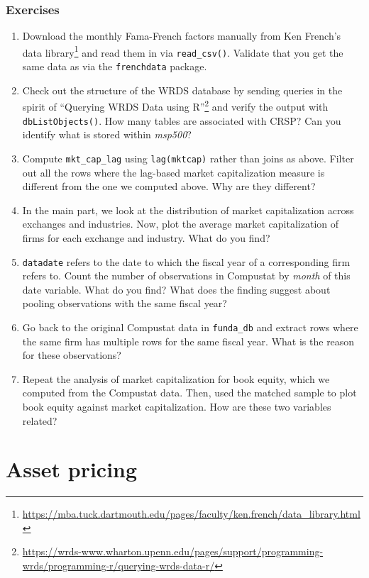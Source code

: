 \documentclass[
]{krantz}
\providecommand{\tightlist}{%
  \setlength{\itemsep}{0pt}\setlength{\parskip}{0pt}}
\renewcommand{\href}[2]{#2\footnote{\url{#1}}}
\begin{document}
\hypertarget{exercises-1}{%
\section{Exercises}\label{exercises-1}}

\begin{enumerate}
\def\labelenumi{\arabic{enumi}.}
\tightlist
\item
  Download the monthly Fama-French factors manually from \href{https://mba.tuck.dartmouth.edu/pages/faculty/ken.french/data_library.html}{Ken French's data library} and read them in via \texttt{read\_csv()}. Validate that you get the same data as via the \texttt{frenchdata} package.
\item
  Check out the structure of the WRDS database by sending queries in the spirit of \href{https://wrds-www.wharton.upenn.edu/pages/support/programming-wrds/programming-r/querying-wrds-data-r/}{``Querying WRDS Data using R''} and verify the output with \texttt{dbListObjects()}. How many tables are associated with CRSP? Can you identify what is stored within \emph{msp500}?
\item
  Compute \texttt{mkt\_cap\_lag} using \texttt{lag(mktcap)} rather than joins as above. Filter out all the rows where the lag-based market capitalization measure is different from the one we computed above. Why are they different?
\item
  In the main part, we look at the distribution of market capitalization across exchanges and industries. Now, plot the average market capitalization of firms for each exchange and industry. What do you find?
\item
  \texttt{datadate} refers to the date to which the fiscal year of a corresponding firm refers to. Count the number of observations in Compustat by \emph{month} of this date variable. What do you find? What does the finding suggest about pooling observations with the same fiscal year?
\item
  Go back to the original Compustat data in \texttt{funda\_db} and extract rows where the same firm has multiple rows for the same fiscal year. What is the reason for these observations?
\item
  Repeat the analysis of market capitalization for book equity, which we computed from the Compustat data. Then, used the matched sample to plot book equity against market capitalization. How are these two variables related?
\end{enumerate}

\hypertarget{part-asset-pricing}{%
\part*{Asset pricing}\label{part-asset-pricing}}
\end{document}
